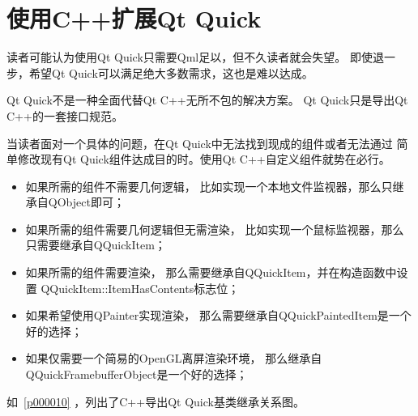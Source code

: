 ﻿




\FloatBarrier
\section{
使用C{\sourcefonttwo{}+}{\sourcefonttwo{}+}扩展Qt Quick
}\label{s100710}


读者可能认为使用Qt Quick只需要Qml足以，但不久读者就会失望。
即使退一步，希望Qt Quick可以满足绝大多数需求，这也是难以达成。

Qt Quick不是一种全面代替Qt C{\sourcefonttwo{}+}{\sourcefonttwo{}+}无所不包的解决方案。
Qt Quick只是导出Qt C{\sourcefonttwo{}+}{\sourcefonttwo{}+}的一套接口规范。

当读者面对一个具体的问题，在Qt Quick中无法找到现成的组件或者无法通过
简单修改现有Qt Quick组件达成目的时。使用Qt C{\sourcefonttwo{}+}{\sourcefonttwo{}+}自定义组件就势在必行。

\begin{itemize}

\item 如果所需的组件不需要几何逻辑，
比如实现一个本地文件监视器，那么只继承自QObject即可；

\item 如果所需的组件需要几何逻辑但无需渲染，
比如实现一个鼠标监视器，那么只需要继承自QQuickItem；

\item 如果所需的组件需要渲染，
那么需要继承自QQuickItem，并在构造函数中设置
QQuickItem::ItemHasContents标志位；

\item 如果希望使用QPainter实现渲染，
那么需要继承自QQuickPaintedItem是一个好的选择；

\item 如果仅需要一个简易的OpenGL离屏渲染环境，
那么继承自QQuickFramebufferObject是一个好的选择；

\end{itemize}

如\figurename\ \ref{p000010}
，列出了C{\sourcefonttwo{}+}{\sourcefonttwo{}+}导出Qt Quick基类继承关系图。

